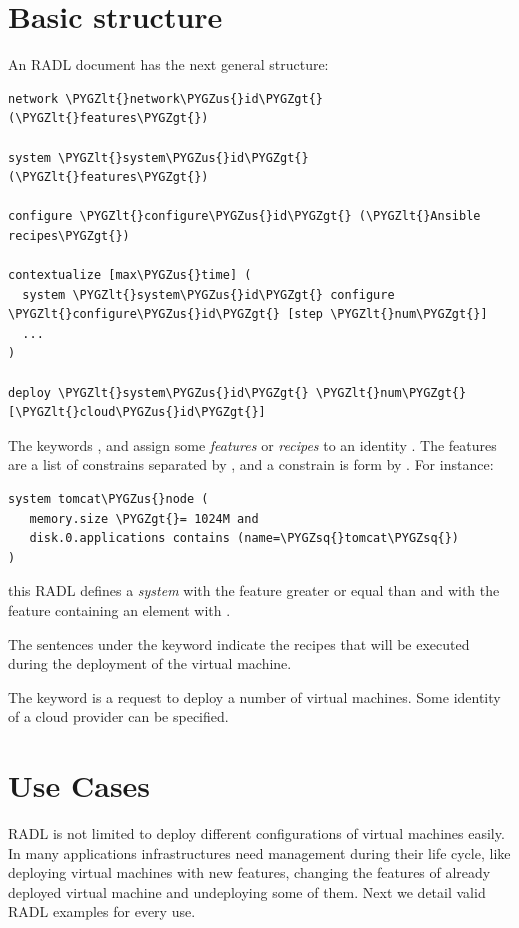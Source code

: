 \documentclass[letterpaper,10pt,english]{sphinxmanual}
\def\PYGZus{\char`\_}
\def\PYGZlt{\char`\<}
\def\PYGZgt{\char`\>}
\def\PYGZsq{\char`\'}
\begin{document}
\section{Basic structure}
\label{radl:basic-structure}
An RADL document has the next general structure:

\begin{Verbatim}[commandchars=\\\{\}]
network \PYGZlt{}network\PYGZus{}id\PYGZgt{} (\PYGZlt{}features\PYGZgt{})

system \PYGZlt{}system\PYGZus{}id\PYGZgt{} (\PYGZlt{}features\PYGZgt{})

configure \PYGZlt{}configure\PYGZus{}id\PYGZgt{} (\PYGZlt{}Ansible recipes\PYGZgt{})

contextualize [max\PYGZus{}time] (
  system \PYGZlt{}system\PYGZus{}id\PYGZgt{} configure \PYGZlt{}configure\PYGZus{}id\PYGZgt{} [step \PYGZlt{}num\PYGZgt{}]
  ...
)

deploy \PYGZlt{}system\PYGZus{}id\PYGZgt{} \PYGZlt{}num\PYGZgt{} [\PYGZlt{}cloud\PYGZus{}id\PYGZgt{}]
\end{Verbatim}

The keywords ,  and  assign some \emph{features}
or \emph{recipes} to an identity . The features are a list of constrains
separated by , and a constrain is form by
. For instance:

\begin{Verbatim}[commandchars=\\\{\}]
system tomcat\PYGZus{}node (
   memory.size \PYGZgt{}= 1024M and
   disk.0.applications contains (name=\PYGZsq{}tomcat\PYGZsq{})
)
\end{Verbatim}

this RADL defines a \emph{system} with the feature  greater or equal
than  and with the feature  containing an
element with  .

The sentences under the keyword  indicate the recipes that
will be executed during the deployment of the virtual machine.

The  keyword is a request to deploy a number of virtual machines.
Some identity of a cloud provider can be specified.


\section{Use Cases}
\label{radl:use-cases}
RADL is not limited to deploy different configurations of virtual machines
easily. In many applications infrastructures need management during their life
cycle, like deploying virtual machines with new features, changing the
features of already deployed virtual machine and undeploying some of them.
Next we detail valid RADL examples for every use.
\end{document}
